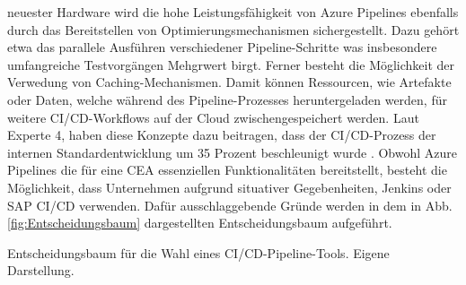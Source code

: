 neuester Hardware wird die hohe Leistungsfähigkeit von Azure Pipelines ebenfalls durch das Bereitstellen von Optimierungsmechanismen sichergestellt. Dazu gehört etwa das parallele Ausführen verschiedener Pipeline-Schritte was insbesondere umfangreiche Testvorgängen Mehgrwert birgt. Ferner besteht die Möglichkeit der Verwedung von Caching-Mechanismen. Damit können Ressourcen, wie Artefakte oder Daten, welche während des Pipeline-Prozesses heruntergeladen werden, für weitere CI/CD-Workflows  auf der Cloud zwischengespeichert werden. Laut Experte 4, haben diese Konzepte dazu beitragen, dass der CI/CD-Prozess der internen Standardentwicklung um 35 Prozent beschleunigt wurde \cite[Z. 58 ff.]{TestDeveloperSAPHyperspaceAdoption&Onboarding.}. Obwohl Azure Pipelines die für eine CEA essenziellen Funktionalitäten bereitstellt, besteht die Möglichkeit, dass Unternehmen aufgrund situativer Gegebenheiten, Jenkins oder SAP CI/CD verwenden. Dafür ausschlaggebende Gründe werden in dem in Abb. \ref{fig:Entscheidungsbaum} dargestellten Entscheidungsbaum aufgeführt.
 \begin{center}
	\begin{table}[H]
		\centering
		\caption[Entscheidungsbaum für die Wahl eines CI/CD-Pipeline-Tools]{Entscheidungsbaum für die Wahl eines CI/CD-Pipeline-Tools. Eigene Darstellung.}
		\label{fig:Entscheidungsbaum}
	\end{table}
\end{center}
\vspace*{-15mm}
